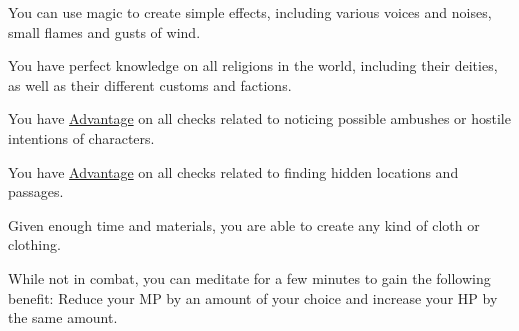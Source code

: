 \begin{description}[leftmargin=*]
{
	You can use magic to create simple effects, including various voices and noises, small flames and gusts of wind.
}

{
	You have perfect knowledge on all religions in the world, including their deities, as well as their different customs and factions.
}

{
	You have \hyperlink{check}{Advantage} on all checks related to noticing possible ambushes or hostile intentions of characters.
}

{
	You have \hyperlink{check}{Advantage} on all checks related to finding hidden locations and passages. 	 
}

{
	Given enough time and materials, you are able to create any kind of cloth or clothing.
}

{
	While not in combat, you can meditate for a few minutes to gain the following benefit:
	Reduce your MP by an amount of your choice and increase your HP by the same amount.
}

\end{description}

\pagebreak
